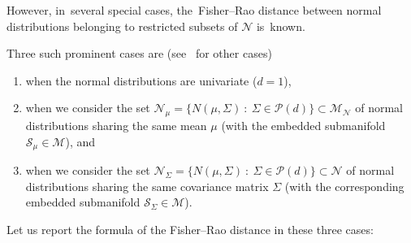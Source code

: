 \documentclass[entropy,article,accept,oneauthor,pdftex,entropy]{Definitions/mdpi}
\def\calS{\mathcal{S}}
\def\calM{\mathcal{M}}
\def\calN{\mathcal{N}}
\def\calP{\mathcal{P}}
\def\st{\ :\ }
\begin{document}
However, in~several special cases, the~Fisher–Rao distance between normal distributions belonging to restricted subsets of $\calN$ is~known.

Three such prominent cases are (see~\cite{FRMVNReview-2020}  for other cases)
\begin{enumerate}
\item  when the normal distributions are univariate ($d=1$),  

\item  when we consider the set
$\calN_\mu=\{N(\mu,\Sigma)\st \Sigma\in\calP(d)\}\subset\calM_{\calN}$ of normal distributions sharing the same mean $\mu$ (with the embedded submanifold $\calS_\mu\in\calM$), and~

\item  when  we consider the set
$\calN_\Sigma=\{N(\mu,\Sigma)\st \Sigma\in\calP(d)\}\subset\calN$ of normal distributions sharing the same covariance matrix $\Sigma$ 
(with the corresponding embedded submanifold $\calS_\Sigma\in\calM$).
\end{enumerate}

Let us report the formula of the Fisher--Rao distance in these three cases:
\end{document}
